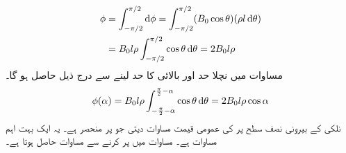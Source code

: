 %
\begin{gather}
\begin{aligned}\label{مساوات_بنیادی_بہاو_بذریع_تکمل_زاویہ_صفر}
\phi&=\int_{-\pi/2}^{\pi/2}\dif \phi=\int_{-\pi/2}^{\pi/2} (B_0 \cos\theta)( \rho l\dif\theta)\\
&=B_0 l \rho \int_{-\pi/2}^{\pi/2} \cos \theta \dif \theta =2 B_0 l \rho
\end{aligned}
\end{gather}
 مساوات   میں نچلا حد  اور بالائی کا حد  لینے سے درج ذیل حاصل ہو گا۔
\begin{align}\label{مساوات_بنیادی_بہاو_بذریع_تکمل_کوئی_زاویہ}
\phi (\alpha) = B_0 l \rho \int_{-\frac{\pi}{2}-\alpha}^{\frac{\pi}{2}-\alpha} \cos \theta \dif \theta =2 B_0 l \rho \cos \alpha
\end{align}
نلکی کے بیرونی نصف سطح  پر  کی عمومی قیمت  مساوات  دیتی جو   پر منحصر ہے۔ یہ ایک بہت اہم مساوات ہے۔ مساوات  میں   پر کرنے سے  مساوات    حاصل ہوتا ہے۔

